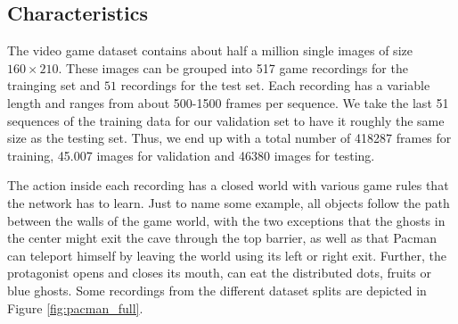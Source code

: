 \subsection{Characteristics}

The video game dataset contains about half a million single images of size $ 160 \times 210 $. These images can be grouped into \num{517} game recordings for the trainging set and $51$ recordings for the test set. Each recording has a variable length and ranges from about \num{500}-\num{1500} frames per sequence. We take the last \num{51} sequences of the training data for our validation set to have it roughly the same size as the testing set. Thus, we end up with a total number of \num{418287} frames for training, \num{45,007} images for validation and \num{46380} images for testing.

The action inside each recording has a closed world with various game rules that the network has to learn. Just to name some example, all objects follow the path between the walls of the game world, with the two exceptions that the ghosts in the center might exit the cave through the top barrier, as well as that Pacman can teleport himself by leaving the world using its left or right exit. Further, the protagonist opens and closes its mouth, can eat the distributed dots, fruits or blue ghosts. Some recordings from the different dataset splits are depicted in Figure \ref{fig:pacman_full}.

